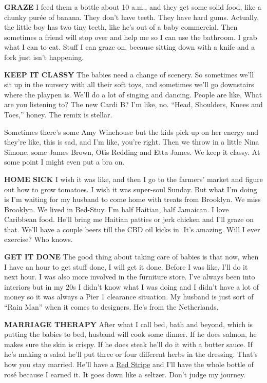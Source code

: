 \textbf{GRAZE} I feed them a bottle about 10 a.m., and they get some
solid food, like a chunky purée of banana. They don't have teeth. They
have hard gums. Actually, the little boy has two tiny teeth, like he's
out of a baby commercial. Then sometimes a friend will stop over and
help me so I can use the bathroom. I grab what I can to eat. Stuff I can
graze on, because sitting down with a knife and a fork just isn't
happening.

\textbf{KEEP IT CLASSY} The babies need a change of scenery. So
sometimes we'll sit up in the nursery with all their soft toys, and
sometimes we'll go downstairs where the playpen is. We'll do a lot of
singing and dancing. People are like, What are you listening to? The new
Cardi B? I'm like, no. ``Head, Shoulders, Knees and Toes,'' honey. The
remix is stellar.

Sometimes there's some Amy Winehouse but the kids pick up on her energy
and they're like, this is sad, and I'm like, you're right. Then we throw
in a little Nina Simone, some James Brown, Otis Redding and Etta James.
We keep it classy. At some point I might even put a bra on.

\textbf{HOME SICK} I wish it was like, and then I go to the farmers'
market and figure out how to grow tomatoes. I wish it was super-soul
Sunday. But what I'm doing is I'm waiting for my husband to come home
with treats from Brooklyn. We miss Brooklyn. We lived in Bed-Stuy. I'm
half Haitian, half Jamaican. I love Caribbean food. He'll bring me
Haitian patties or jerk chicken and I'll graze on that. We'll have a
couple beers till the CBD oil kicks in. It's amazing. Will I ever
exercise? Who knows.

\textbf{GET IT DONE} The good thing about taking care of babies is that
now, when I have an hour to get stuff done, I will get it done. Before I
was like, I'll do it next hour. I was also more involved in the
furniture store. I've always been into interiors but in my 20s I didn't
know what I was doing and I didn't have a lot of money so it was always
a Pier 1 clearance situation. My husband is just sort of ``Rain Man''
when it comes to designers. He's from the Netherlands.

\textbf{MARRIAGE THERAPY} After what I call bed, bath and beyond, which
is putting the babies to bed, husband will cook some dinner. If he does
salmon, he makes sure the skin is crispy. If he does steak he'll do it
with a butter sauce. If he's making a salad he'll put three or four
different herbs in the dressing. That's how you stay married. He'll have
a \href{https://redstripebeer.com/our-beer/}{Red Stripe} and I'll have
the whole bottle of rosé because I earned it. It goes down like a
seltzer. Don't judge my journey.

